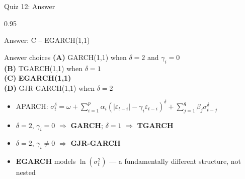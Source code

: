 \documentclass[9pt, aspectratio=169, t]{beamer}
\begin{document}
\begin{frame}{Quiz 12: Answer}
    \begin{cminipage}{0.95\textwidth}
    {\small
    \begin{exampleblock}{Answer: C -- EGARCH(1,1)}

    \vspace{0.1cm}

    \begin{block}{Answer choices}
        \textcolor{MainBlue}{\textbf{(A)}} GARCH(1,1) when $\delta = 2$ and $\gamma_i = 0$ \incorrect\\[2pt]
        \textcolor{MainBlue}{\textbf{(B)}} TGARCH(1,1) when $\delta = 1$ \incorrect\\[2pt]
        \textcolor{MainBlue}{\textbf{(C)}} \textbf{\textcolor{Forest}{EGARCH(1,1)}} \correct\\[2pt]
        \textcolor{MainBlue}{\textbf{(D)}} GJR-GARCH(1,1) when $\delta = 2$ \incorrect
    \end{block}

        \vspace{0.1cm}

        \begin{itemize}\setlength{\itemsep}{0pt}
            \item APARCH: $\sigma_t^\delta = \omega + \sum_{i=1}^p \alpha_i(|\varepsilon_{t-i}| - \gamma_i \varepsilon_{t-i})^\delta + \sum_{j=1}^q \beta_j \sigma_{t-j}^\delta$
            \item $\delta = 2$, $\gamma_i = 0$ $\Rightarrow$ \textbf{GARCH}; \; $\delta = 1$ $\Rightarrow$ \textbf{TGARCH}
            \item $\delta = 2$, $\gamma_i \neq 0$ $\Rightarrow$ \textbf{GJR-GARCH}
            \item \textbf{EGARCH} models $\ln(\sigma_t^2)$ --- a fundamentally different structure, not nested
        \end{itemize}
    \end{exampleblock}
    }

    \end{cminipage}
\end{frame}
\end{document}
